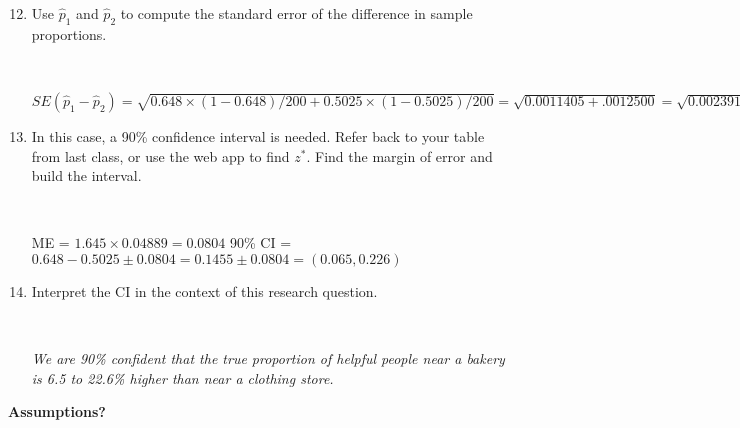 \begin{enumerate}
  \setcounter{enumi}{11}
  \item Use $ \widehat{p}_1$ and $\widehat{p}_2$ to compute the standard
    error of the difference in sample proportions.
\begin{students}
  \vspace{2cm}\\
\end{students}
\begin{key}
$ SE(\widehat{p}_1 - \widehat{p}_2) = \sqrt{ 0.648\times(1- 0.648)/200
  + 0.5025\times(1-  0.5025)/200} = \sqrt{0.0011405 + .0012500 } =
\sqrt{0.002391 } = 0.04889 $
\end{key}

\item In this case, a 90\% confidence interval is needed.  Refer back
  to your table from last class, or use the web app
  to find $z^*$.  Find the margin of error and   build the interval.
\begin{students}
 \vspace{1cm}\\
\end{students}
\begin{key}
ME = $ 1.645 \times 0.04889 = 0.0804 $ 90\% CI =  $0.648 - 0.5025 \pm
0.0804 = 0.1455 \pm 0.0804 = (0.065, 0.226)$
\end{key}

\item Interpret the CI in the context of this research question.
\begin{students}
 \vspace{1cm}\\
\vspace{1in}
\end{students}
\begin{key}
 {\it We are 90\% confident that the true proportion of helpful people
   near a bakery is 6.5 to 22.6\% higher than near a clothing store.}
\end{key}
\end{enumerate}

\begin{center}
  {\large\bf Assumptions?}
\end{center}

